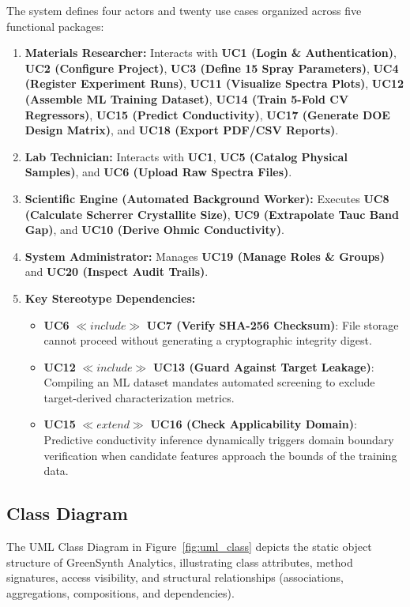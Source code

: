 \documentclass[12pt,a4paper,oneside]{report}
\begin{document}
{{{The system defines four actors and twenty use cases organized across five functional packages:
\begin{enumerate}
    \item \textbf{Materials Researcher:} Interacts with \textbf{UC1 (Login \& Authentication)}, \textbf{UC2 (Configure Project)}, \textbf{UC3 (Define 15 Spray Parameters)}, \textbf{UC4 (Register Experiment Runs)}, \textbf{UC11 (Visualize Spectra Plots)}, \textbf{UC12 (Assemble ML Training Dataset)}, \textbf{UC14 (Train 5-Fold CV Regressors)}, \textbf{UC15 (Predict Conductivity)}, \textbf{UC17 (Generate DOE Design Matrix)}, and \textbf{UC18 (Export PDF/CSV Reports)}.
    \item \textbf{Lab Technician:} Interacts with \textbf{UC1}, \textbf{UC5 (Catalog Physical Samples)}, and \textbf{UC6 (Upload Raw Spectra Files)}.
    \item \textbf{Scientific Engine (Automated Background Worker):} Executes \textbf{UC8 (Calculate Scherrer Crystallite Size)}, \textbf{UC9 (Extrapolate Tauc Band Gap)}, and \textbf{UC10 (Derive Ohmic Conductivity)}.
    \item \textbf{System Administrator:} Manages \textbf{UC19 (Manage Roles \& Groups)} and \textbf{UC20 (Inspect Audit Trails)}.
    \item \textbf{Key Stereotype Dependencies:} 
    \begin{itemize}
        \item \textbf{UC6} $\ll include \gg$ \textbf{UC7 (Verify SHA-256 Checksum)}: File storage cannot proceed without generating a cryptographic integrity digest.
        \item \textbf{UC12} $\ll include \gg$ \textbf{UC13 (Guard Against Target Leakage)}: Compiling an ML dataset mandates automated screening to exclude target-derived characterization metrics.
        \item \textbf{UC15} $\ll extend \gg$ \textbf{UC16 (Check Applicability Domain)}: Predictive conductivity inference dynamically triggers domain boundary verification when candidate features approach the bounds of the training data.
    \end{itemize}
\end{enumerate}

\subsection{Class Diagram}

The UML Class Diagram in Figure~\ref{fig:uml_class} depicts the static object structure of GreenSynth Analytics, illustrating class attributes, method signatures, access visibility, and structural relationships (associations, aggregations, compositions, and dependencies).

}}}
\end{document}

